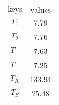 \begin{minipage}{0.49\textwidth}
 \centering
 \begin{tabular}{S|S}
 \toprule
$\text{keys}$ & $\text{values}$ \\
 \midrule
 $T_{1}$ &  7.79  \\
  $T_{2}$ & 7.76  \\
$T_{+}$  &  7.63  \\
$T_{-}$  & 7.25  \\
$T_{K}$  & 133.94  \\
$T_{S}$ & 25.48 \\
 \bottomrule
 \end{tabular}
 \label{tab:mids_T_60}
  \end{minipage}
